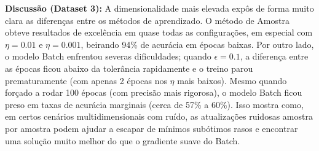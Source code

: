 \documentclass[12pt,a4paper]{article}
\begin{document}
\textbf{Discussão (Dataset 3):} A dimensionalidade mais elevada expôs de forma muito clara as diferenças entre os métodos de aprendizado. O método de Amostra obteve resultados de excelência em quase todas as configurações, em especial com $\eta=0.01$ e $\eta=0.001$, beirando 94\% de acurácia em épocas baixas. Por outro lado, o modelo Batch enfrentou severas dificuldades; quando $\epsilon=0.1$, a diferença entre as épocas ficou abaixo da tolerância rapidamente e o treino parou prematuramente (com apenas 2 épocas nos $\eta$ mais baixos). Mesmo quando forçado a rodar 100 épocas (com precisão mais rigorosa), o modelo Batch ficou preso em taxas de acurácia marginais (cerca de 57\% a 60\%). Isso mostra como, em certos cenários multidimensionais com ruído, as atualizações ruidosas amostra por amostra podem ajudar a escapar de mínimos subótimos rasos e encontrar uma solução muito melhor do que o gradiente suave do Batch.
\end{document}
